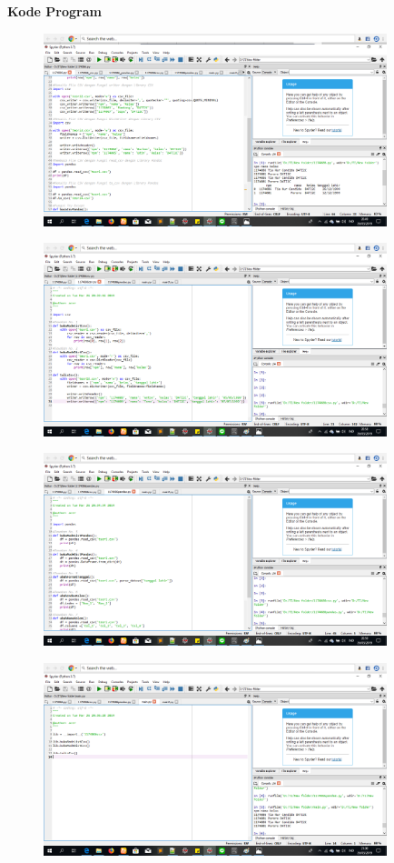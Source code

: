\begin{enumerate}
\textbf{Kode Program}
\begin{figure}[H]
	\includegraphics[width=10cm]{figures/4/1174086/k1.png}
	\centering
\end{figure}
\begin{figure}[H]
	\includegraphics[width=10cm]{figures/4/1174086/k2.png}
	\centering
\end{figure}
\begin{figure}[H]
	\includegraphics[width=10cm]{figures/4/1174086/k3.png}
	\centering
\end{figure}
\begin{figure}[H]
	\includegraphics[width=10cm]{figures/4/1174086/k4.png}

\end{figure}
\end{enumerate}
